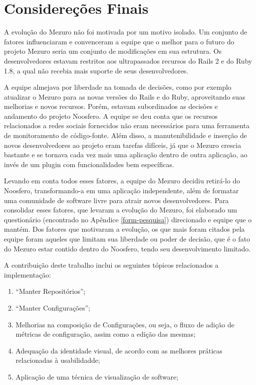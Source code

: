 \chapter{Considereções Finais}

A evolução do Mezuro não foi motivada por um motivo isolado. Um conjunto de fatores influenciaram e convenceram a equipe que o melhor para o futuro do projeto Mezuro seria um conjunto de modificações em sua estrutura. Os desenvolvedores estavam restritos aos ultrapassados recursos do Rails 2 e do Ruby 1.8, a qual não recebia mais suporte de seus desenvolvedores.

A equipe almejava por liberdade na tomada de decisões, como por exemplo atualizar o Mezuro para as novas versões do Rails e do Ruby, aproveitando suas melhorias e novos recursos. Porém, estavam subordinados as decisões e andamento do projeto Noosfero. A equipe se deu conta que os recursos relacionados a redes sociais fornecidos não eram necessários para uma ferramenta de monitoramento de código-fonte. Além disso, a manutenibilidade e inserção de novos desenvolvedores ao projeto eram tarefas difíceis, já que o Mezuro crescia bastante e se tornava cada vez mais uma aplicação dentro de outra aplicação, ao invés de um plugin com funcionalidades bem específicas.

Levando em conta todos esses fatores, a equipe do Mezuro decidiu retirá-lo do Noosfero, transformando-a em uma aplicação independente, além de formatar uma comunidade de software livre para atrair novos desenvolvedores. Para consolidar esses fatores, que levaram a evolução do Mezuro, foi elaborado um questionário (encontrado no Apêndice \ref{form-pesquisa}) direcionado e equipe que o mantém. Dos fatores que motivaram a evolução, os que mais foram citados pela equipe foram aqueles que limitam sua liberdade ou poder de decisão, que é o fato do Mezuro estar contido dentro do Noosfero, tendo seu desenvolvimento limitado.

A contribuição deste trabalho inclui os seguintes tópicos relacionados a implementação:
\begin{enumerate}
\item ``Manter Repositórios'';
\item ``Manter Configurações'';
\item Melhorias na composição de Configurações, ou seja, o fluxo de adição de métricas de configuração, assim como a edição das mesmas;
\item Adequação da identidade visual, de acordo com as melhores práticas relacionadas à usabilidadde;
\item Aplicação de uma técnica de visualização de software;
\end{enumerate}

